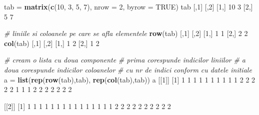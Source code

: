 \documentclass[]{article}
\newenvironment{Shaded}{\begin{snugshade}}{\end{snugshade}}
\newcommand{\KeywordTok}[1]{\textcolor[rgb]{0.13,0.29,0.53}{\textbf{#1}}}
\newcommand{\DataTypeTok}[1]{\textcolor[rgb]{0.13,0.29,0.53}{#1}}
\newcommand{\DecValTok}[1]{\textcolor[rgb]{0.00,0.00,0.81}{#1}}
\newcommand{\StringTok}[1]{\textcolor[rgb]{0.31,0.60,0.02}{#1}}
\newcommand{\CommentTok}[1]{\textcolor[rgb]{0.56,0.35,0.01}{\textit{#1}}}
\newcommand{\OtherTok}[1]{\textcolor[rgb]{0.56,0.35,0.01}{#1}}
\newcommand{\NormalTok}[1]{#1}
\begin{document}
\begin{Shaded}
\begin{Highlighting}[]
\NormalTok{tab =}\StringTok{ }\KeywordTok{matrix}\NormalTok{(}\KeywordTok{c}\NormalTok{(}\DecValTok{10}\NormalTok{, }\DecValTok{3}\NormalTok{, }\DecValTok{5}\NormalTok{, }\DecValTok{7}\NormalTok{), }\DataTypeTok{nrow =} \DecValTok{2}\NormalTok{, }\DataTypeTok{byrow =} \OtherTok{TRUE}\NormalTok{)}
\NormalTok{tab}
\NormalTok{     [,}\DecValTok{1}\NormalTok{] [,}\DecValTok{2}\NormalTok{]}
\NormalTok{[}\DecValTok{1}\NormalTok{,]   }\DecValTok{10}    \DecValTok{3}
\NormalTok{[}\DecValTok{2}\NormalTok{,]    }\DecValTok{5}    \DecValTok{7}

\CommentTok{# liniile si coloanele pe care se afla elementele}
\KeywordTok{row}\NormalTok{(tab)}
\NormalTok{     [,}\DecValTok{1}\NormalTok{] [,}\DecValTok{2}\NormalTok{]}
\NormalTok{[}\DecValTok{1}\NormalTok{,]    }\DecValTok{1}    \DecValTok{1}
\NormalTok{[}\DecValTok{2}\NormalTok{,]    }\DecValTok{2}    \DecValTok{2}
\KeywordTok{col}\NormalTok{(tab)}
\NormalTok{     [,}\DecValTok{1}\NormalTok{] [,}\DecValTok{2}\NormalTok{]}
\NormalTok{[}\DecValTok{1}\NormalTok{,]    }\DecValTok{1}    \DecValTok{2}
\NormalTok{[}\DecValTok{2}\NormalTok{,]    }\DecValTok{1}    \DecValTok{2}

\CommentTok{# cream o lista cu doua componente}
\CommentTok{# prima corespunde indicilor liniilor}
\CommentTok{# a doua corespunde indicilor coloanelor}
\CommentTok{# cu nr de indici conform cu datele initiale}
\NormalTok{a =}\StringTok{ }\KeywordTok{list}\NormalTok{(}\KeywordTok{rep}\NormalTok{(}\KeywordTok{row}\NormalTok{(tab),tab), }\KeywordTok{rep}\NormalTok{(}\KeywordTok{col}\NormalTok{(tab),tab))}
\NormalTok{a}
\NormalTok{[[}\DecValTok{1}\NormalTok{]]}
\NormalTok{ [}\DecValTok{1}\NormalTok{] }\DecValTok{1} \DecValTok{1} \DecValTok{1} \DecValTok{1} \DecValTok{1} \DecValTok{1} \DecValTok{1} \DecValTok{1} \DecValTok{1} \DecValTok{1} \DecValTok{2} \DecValTok{2} \DecValTok{2} \DecValTok{2} \DecValTok{2} \DecValTok{1} \DecValTok{1} \DecValTok{1} \DecValTok{2} \DecValTok{2} \DecValTok{2} \DecValTok{2} \DecValTok{2} \DecValTok{2} \DecValTok{2}

\NormalTok{[[}\DecValTok{2}\NormalTok{]]}
\NormalTok{ [}\DecValTok{1}\NormalTok{] }\DecValTok{1} \DecValTok{1} \DecValTok{1} \DecValTok{1} \DecValTok{1} \DecValTok{1} \DecValTok{1} \DecValTok{1} \DecValTok{1} \DecValTok{1} \DecValTok{1} \DecValTok{1} \DecValTok{1} \DecValTok{1} \DecValTok{1} \DecValTok{2} \DecValTok{2} \DecValTok{2} \DecValTok{2} \DecValTok{2} \DecValTok{2} \DecValTok{2} \DecValTok{2} \DecValTok{2} \DecValTok{2}
\end{Highlighting}
\end{Shaded}
\end{document}
